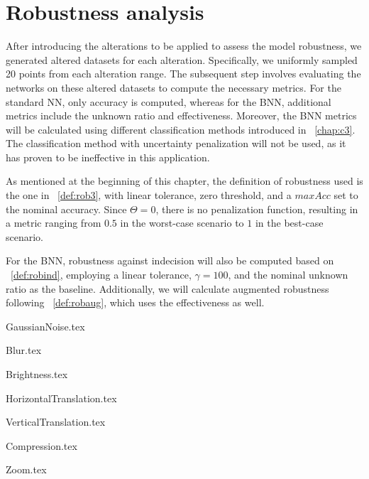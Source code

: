 \section{Robustness analysis}

After introducing the alterations to be applied to assess the model robustness, we generated altered datasets for each alteration. Specifically, we uniformly sampled 20 points from each alteration range. The subsequent step involves evaluating the networks on these altered datasets to compute the necessary metrics. For the standard NN, only accuracy is computed, whereas for the BNN, additional metrics include the unknown ratio and effectiveness. Moreover, the BNN metrics will be calculated using different classification methods introduced in \Chap~\ref{chap:c3}. The classification method with uncertainty penalization will not be used, as it has proven to be ineffective in this application.

As mentioned at the beginning of this chapter, the definition of robustness used is the one in \Def~\ref{def:rob3}, with linear tolerance, zero threshold, and a $maxAcc$ set to the nominal accuracy. Since $\Theta=0$, there is no penalization function, resulting in a metric ranging from $0.5$ in the worst-case scenario to $1$ in the best-case scenario.

For the BNN, robustness against indecision will also be computed based on \Def~\ref{def:robind}, employing a linear tolerance, $\gamma=100$, and the nominal unknown ratio as the baseline. Additionally, we will calculate augmented robustness following \Def~\ref{def:robaug}, which uses the effectiveness as well.

{GaussianNoise.tex}

{Blur.tex}

{Brightness.tex}

{HorizontalTranslation.tex}

{VerticalTranslation.tex}

{Compression.tex}

{Zoom.tex}